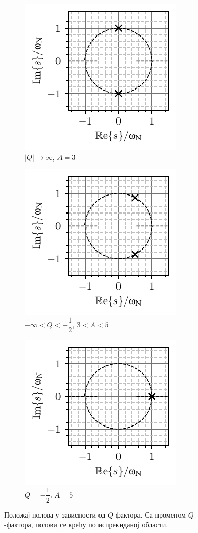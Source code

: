 \begin{figure}[b!]
    \begin{subfigure}[t]{0.32\textwidth}
        \centering
        \includegraphics{fig/Q_polovi_4.pdf}
        \caption{$|Q| \to \infty$, $ A = 3$}
    \end{subfigure}
    \begin{subfigure}[t]{0.32\textwidth}
        \centering
        \includegraphics{fig/Q_polovi_5.pdf}
        \caption{$-\infty < Q < -\dfrac{1}{2}$, $3 < A < 5$}
    \end{subfigure}
    \begin{subfigure}[t]{0.32\textwidth}
        \centering
        \includegraphics{fig/Q_polovi_6.pdf}
        \caption{$Q = -\dfrac{1}{2}$, $A = 5$}
    \end{subfigure}
    \caption{Положај полова у зависности од $Q$-фактора. Са променом $Q$-фактора, полови се крећу по испрекиданој области.}
    \label{fig:\ID.polovi}
\end{figure}
